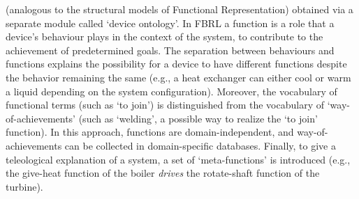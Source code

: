 \documentclass[
]{ceurart}
\begin{document}
\begin{itemize}
    (analogous to the structural models of Functional Representation) obtained via a separate module called `device ontology'. %
    In FBRL a function is a role that a device's behaviour plays in the context of the system, to contribute to the achievement of predetermined goals. The separation between behaviours and functions explains the possibility for a device to have different functions despite the behavior remaining the same (e.g., a heat exchanger can either cool or warm a liquid depending on the system configuration). Moreover, the vocabulary of functional terms (such as `to join') is distinguished from the vocabulary of `way-of-achievements' (such as `welding', a possible way to realize the `to join' function). 
    In this approach, functions are domain-independent, and way-of-achievements can be collected in domain-specific databases.
    Finally, to give a teleological explanation of a system, a set of `meta-functions' is introduced (e.g., the give-heat function of the boiler \textit{drives} the rotate-shaft function of the turbine). 
\end{itemize}
\end{document}
